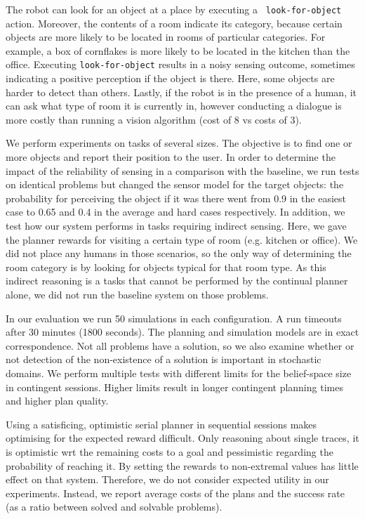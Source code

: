 The robot can look for an object at a place by executing a {\tt
  look-for-object} action. Moreover, the contents of a room indicate
its category, because certain objects are more likely to be located in
rooms of particular categories. For example, a box of cornflakes is
more likely to be located in the kitchen than the office. Executing
{\tt look-for-object} results in a noisy sensing outcome, sometimes
indicating a positive perception if the object is there. Here, some
objects are harder to detect than others. Lastly, if the robot is in
the presence of a human, it can ask what type of room it is currently
in, however conducting a dialogue is more costly than running a vision
algorithm (cost of 8 vs costs of 3).


We perform experiments on tasks of several sizes. The objective is to
find one or more objects and report their position to the user. In
order to determine the impact of the reliability of sensing in a
comparison with the baseline, we run tests on identical problems but
changed the sensor model for the target objects: the probability for
perceiving the object if it was there went from 0.9 in the easiest
case to 0.65 and 0.4 in the average and hard cases respectively. In
addition, we test how our system performs in tasks requiring indirect
sensing. Here, we gave the planner rewards for visiting a certain type
of room (e.g. kitchen or office). We did not place any humans in those
scenarios, so the only way of determining the room category is by
looking for objects typical for that room type. As this indirect
reasoning is a tasks that cannot be performed by the continual planner
alone, we did not run the baseline system on those problems.



In our evaluation we run 50 simulations in each configuration. A run
timeouts after 30 minutes (1800 seconds). The planning and simulation
models are in exact correspondence. Not all problems have a solution,
so we also examine whether or not detection of the non-existence of a
solution is important in stochastic domains.
We perform multiple tests with different limits for the
belief-space size in contingent sessions.  Higher limits result in
longer contingent planning times and higher plan quality.


Using a satisficing, optimistic serial planner in sequential sessions
makes optimising for the expected reward difficult. Only reasoning
about single traces, it is optimistic wrt the remaining costs to a
goal and pessimistic regarding the probability of reaching it. By
setting the rewards to non-extremal values has little effect on that
system. Therefore, we do not consider expected utility in our
experiments. Instead, we report average costs of the plans and the
success rate (as a ratio between solved and solvable problems).

